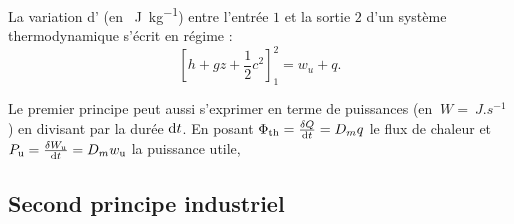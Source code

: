 \documentclass[12pt,fancy]{cours}
\begin{document}
\begin{theorem}\label{form:1principe}
La variation d’ (en \SI{}{J.kg^{-1}}) entre l’entrée $1$ et la sortie $2$  d'un système thermodynamique  s’écrit en régime   :
\begin{equation*}
\left[ h + g z + \frac{1}{2}c^2\right]_1^2  = w_u + q.
\end{equation*}
\end{theorem}

Le premier principe peut aussi s'exprimer en terme de puissances (en $\SI{}{W} = \SI{}{J.s^{-1}}$) en divisant  par la durée $\mathrm{d} t$. En posant $\Phi_{\rm{th}}=\frac{\delta Q}{\mathrm{d} t}=D_m q$ le flux de chaleur et $P_{\text{u}}=\frac{\delta W_{\rm u}}{\mathrm{d} t} = D_m w_{\rm u}$ la puissance utile, 

\subsection{Second principe industriel}
\end{document}
